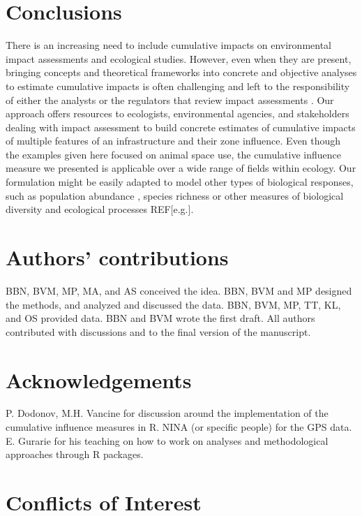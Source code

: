 \documentclass[titlepage]{article}
\begin{document}
\section{Conclusions}

There is an increasing need to include cumulative impacts on environmental impact assessments and ecological studies. However, even when they are present, bringing concepts and theoretical frameworks into concrete and objective analyses to estimate cumulative impacts is often challenging and left to the responsibility of either the analysts or the regulators that review impact assessments \citep{johnson_regulating_2011}. Our approach offers resources to ecologists, environmental agencies, and stakeholders dealing with impact assessment to build concrete estimates of cumulative impacts of multiple features of an infrastructure and their zone influence. 
Even though the examples given here focused on animal space use, the cumulative influence measure we presented is applicable over a wide range
of fields within ecology. Our formulation might be easily adapted to model other types of biological responses, such as population abundance \citep[e.g.][]{benitez-lopez_impacts_2010},
species richness \citep[e.g.][]{ficetola_ecological_2009} or other measures of biological diversity and ecological processes REF[e.g.].
      
\section*{Authors’ contributions}

BBN, BVM, MP, MA, and AS conceived the idea. BBN, BVM and MP designed the methods, and analyzed and discussed the data. BBN, BVM, MP, TT, KL, and OS provided data. BBN and BVM wrote the first draft. All authors contributed with discussions and to the final version of the manuscript.

\section*{Acknowledgements}

P. Dodonov, M.H. Vancine for discussion around the implementation of the cumulative influence measures in R. NINA (or specific people) for the GPS data. E. Gurarie for his teaching on how to work on analyses and methodological approaches through R packages.

\section*{Conflicts of Interest}
\end{document}
